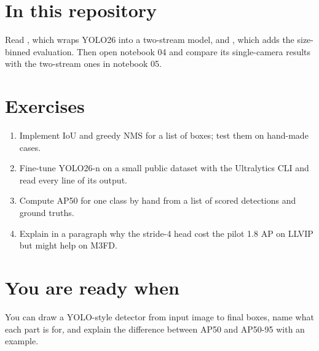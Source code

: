 \section{In this repository}

Read , which wraps YOLO26 into a two-stream model, and
, which adds the size-binned evaluation. Then open notebook 04 and compare its single-camera
results with the two-stream ones in notebook 05.

\section{Exercises}

\begin{enumerate}
  \item Implement IoU and greedy NMS for a list of boxes; test them on hand-made cases.
  \item Fine-tune YOLO26-n on a small public dataset with the Ultralytics CLI and read every line of its output.
  \item Compute AP50 for one class by hand from a list of scored detections and ground truths.
  \item Explain in a paragraph why the stride-4 head cost the pilot 1.8 AP on LLVIP but might help on M3FD.
\end{enumerate}

\section{You are ready when}

You can draw a YOLO-style detector from input image to final boxes, name what each part is for, and explain
the difference between AP50 and AP50-95 with an example.
